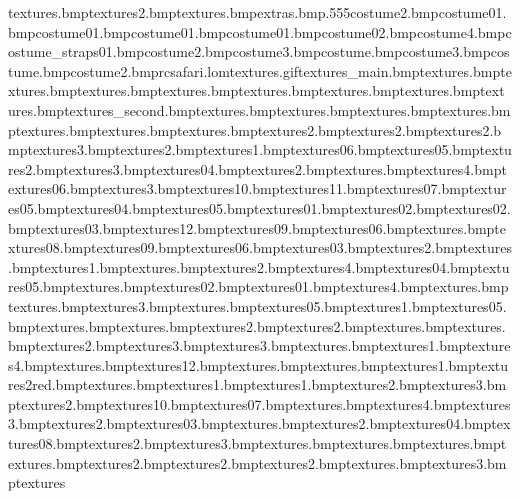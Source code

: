 textures\electricfencewire.bmp textures\electricfencewire2.bmp textures\saftrailer.bmp extras\map.bmp.555 costume\liftmag2.bmp costume\skaterboard01.bmp costume\skatercap01.bmp costume\skaterwheel01.bmp costume\elbowpad01.bmp costume\elbowpad02.bmp costume\tongueline4.bmp costume\safaripack_straps01.bmp costume\bodyeyebrow2.bmp costume\eyetex3.bmp costume\muzzlestubble.bmp costume\bodytoes3.bmp costume\noseshine.bmp costume\earslined2.bmp rcsafari.lom textures\goarrow.gif textures\safariset_main.bmp textures\yellowbug.bmp textures\ladybird.bmp textures\spider.bmp textures\beetle.bmp textures\caterpillar.bmp textures\bluesnake.bmp textures\worm.bmp textures\adder.bmp textures\safariset_second.bmp textures\toadstool.bmp textures\fungi.bmp textures\leaftree.bmp textures\leafred.bmp textures\leafpurple.bmp textures\leafgreen.bmp textures\leafblue.bmp textures\blue2.bmp textures\red2.bmp textures\yellow2.bmp textures\white3.bmp textures\white2.bmp textures\white1.bmp textures\splinter06.bmp textures\splinter05.bmp textures\grassedge2.bmp textures\grassedge3.bmp textures\hubflowers04.bmp textures\electricfencesmash2.bmp textures\grassjoiner.bmp textures\electricfencesmash4.bmp textures\hubflowers06.bmp textures\electricfencesmash3.bmp textures\safrock10.bmp textures\safrock11.bmp textures\safrock07.bmp textures\safrock05.bmp textures\safrock04.bmp textures\safrockcream05.bmp textures\safrock01.bmp textures\safrock02.bmp textures\safrockcream02.bmp textures\safrockcream03.bmp textures\safrockcream12.bmp textures\safrockcream09.bmp textures\safrockcream06.bmp textures\safwall.bmp textures\safrock08.bmp textures\safrock09.bmp textures\safrock06.bmp textures\safrock03.bmp textures\safwall2.bmp textures\woodplank.bmp textures\wbridge1.bmp textures\hutwood.bmp textures\woodplank2.bmp textures\treeroots4.bmp textures\grasstocobble04.bmp textures\hubflowers05.bmp textures\footprintgreen.bmp textures\hubflowers02.bmp textures\hubflowers01.bmp textures\grassedge4.bmp textures\footprintorangeron.bmp textures\footprintorange.bmp textures\grassjoiner3.bmp textures\arrows.bmp textures\grasstocobble05.bmp textures\track1.bmp textures\hubpath05.bmp textures\trackcorner.bmp textures\tracks.bmp textures\track2.bmp textures\tracksfade2.bmp textures\tracksfade.bmp textures\storagepath.bmp textures\storagepath2.bmp textures\storagepath3.bmp textures\grassshad3.bmp textures\leavescorn.bmp textures\leaves1.bmp textures\leaves4.bmp textures\grassshad.bmp textures\safrock12.bmp textures\pathrock.bmp textures\pathrockcor.bmp textures\trunkred1.bmp textures\trunkend2red.bmp textures\leavescoryellow.bmp textures\leavesyellow1.bmp textures\leafpath1.bmp textures\leafpath2.bmp textures\leafpath3.bmp textures\leavesyellow2.bmp textures\safrockcream10.bmp textures\safrockcream07.bmp textures\trunkendred.bmp textures\trunkred4.bmp textures\trunkred3.bmp textures\trunkred2.bmp textures\grasstocobble03.bmp textures\footprintyellow.bmp textures\grassjoiner2.bmp textures\safrockcream04.bmp textures\safrockcream08.bmp textures\grasswedgeblue2.bmp textures\grassblue3.bmp textures\grasswbluetuft.bmp textures\grassjoinerelephant.bmp textures\cagewall.bmp textures\footprintblue.bmp textures\leavespurp2.bmp textures\treeroots2.bmp textures\leavecorpurp2.bmp textures\leavespurp.bmp textures\treeroots3.bmp textures\vanskidmar